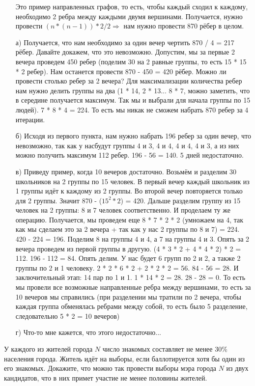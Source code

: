 \documentclass{article}
\begin{document}
\begin{solution}[7]
\begin{enumerate}
Это пример направленных графов, то есть, чтобы каждый сходил к каждому, необходимо 2 ребра между каждыми двумя вершинами. Получается, нужно провести $(n * (n - 1)) * 2 / 2 \Rightarrow$ нам нужно провести 870 рёбер в целом.
\item[а)] Получается, что нам необходимо за один вечер чертить 870 / 4 = 217 рёбер. Давайте докажем, что это невозможно. Допустим, мы за первые 2 вечера проведем 450 ребер (поделим 30 на 2 равные группы, то есть 15 * 15 * 2 ребер). Нам останется провести 870 - 450 = 420 рёбер. Можно ли провести столько ребер за 2 вечера? Для максимализации количества ребер нам нужно делить группы на два (1 * 14, 2 * 13... 8 * 7, можно заметить, что в середине получается максимум. Так мы и выбрали для начала группы по 15 людей). 7 * 8 * 4 = 224. То есть мы никак не сможем набрать 870 ребер за 4 итерации. 
\item[б)] Исходя из первого пункта, нам нужно набрать 196 ребер за один вечер, что невозможно, так как у насбудут группы 4 и 3, 4 и 4, 4 и 4, 4 и 3, а из них можно получить максимум 112 ребер. 196 - 56 = 140. 5 дней недостаточно.
\item[в)] Приведу пример, когда 10 вечеров достаточно. Возьмём и разделим 30 школьников на 2 группы по 15 человек. В первый вечер каждый школьник из 1 группы идёт к каждому из 2 группы. Во второй вечер повторяется только для 2 группы. Значит 870 - ($15^2 * 2$) = 420. Дальше разделим группу из 15 человек на 2 группы: 8 и 7 человек соответственно. И проделаем ту же операцию. Получается, мы проведем еще 8 * 7 * 2 * 2 (умножаем на 4, так как мы сделаем это за 2 вечера + так как у нас 2 группы по 8 и 7) = 224. 420 - 224 = 196. Поделим 8 на группы 4 и 4, а 7 на группы 4 и 3. Опять за 2 вечера проведем из первой группы в другую. (4 * 3 * 2 + 4 * 4 * 2) * 2 = 112. 196 - 112 = 84. Опять делим. У нас будет 6 групп по 2 и 2, а также 2 группы по 2 и 1 человеку. 2 * 2 * 6 * 2 + 2 * 2 * 2 = 56. 84 - 56 = 28. И заключительный этап: 14 пар по 1 и 1. 1 * 14 * 2 = 28. 28 - 28 = 0. То есть мы провели все возможные направленные ребра между вершинами, то есть за 10 вечеров мы справились (при разделении мы тратили по 2 вечера, чтобы каждая группа обменялась ребрами между собой, то есть было 5 разделение, следовательно 5 * 2 = 10 вечеров)
\item[г)] Что-то мне кажется, что этого недостаточно...
\end{enumerate}
\end{solution}
\begin{task}[3]
У каждого из жителей города $N$ число знакомых составляет не менее 30\% населения города. Житель идёт на выборы, если баллотируется хотя бы один из его знакомых. Докажите, что можно так провести выборы мэра города $N$ из двух кандидатов, что в них примет участие не менее половины жителей.
\end{task}
\end{document}
